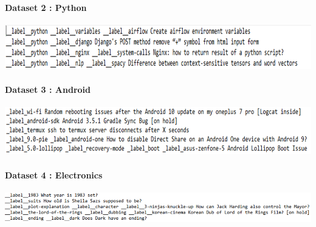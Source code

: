 \documentclass[a4paper,1pt]{article}
\begin{document}
\paragraph{Dataset 2 : Python}

\begin{center}
	\begin{minipage}{\linewidth}
		\centering
		\includegraphics[width=1.0\linewidth]{"Precision and Recall at position 20"}
		
	\end{minipage}
\end{center}

\paragraph{Dataset 3 : Android}

\begin{center}
	\begin{minipage}{\linewidth}
		\centering
		\includegraphics[width=1.0\linewidth]{"Precision and Recall at position 21"}
		
	\end{minipage}
\end{center}

\paragraph{Dataset 4 :  Electronics}

\begin{center}
	\begin{minipage}{\linewidth}
		\centering
		\includegraphics[width=1.0\linewidth]{"Precision and Recall at position 22"}
		
	\end{minipage}
\end{center}
\end{document}
